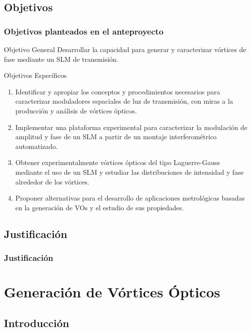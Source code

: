 \documentclass[xcolor=table,serif]{beamer}
\begin{document}
\subsection{Objetivos}
\begin{frame}
  \frametitle{Objetivos planteados en el anteproyecto}
  \begin{block}{Objetivo General}
    Desarrollar la capacidad para generar y caracterizar vórtices de fase
    mediante un SLM de transmisión. 
  \end{block}
  \begin{block}{Objetivos Espec\'ificos}
    \small
    \begin{enumerate}
	\item Identificar y apropiar los conceptos y
                  procedimientos necesarios para caracterizar
                  moduladores espaciales de luz de transmisión, con
                  miras a la producción y análisis de vórtices
                  ópticos. 
        \item Implementar una plataforma experimental para
                  caracterizar la modulación de amplitud y fase de un
                  SLM a partir de un montaje interferométrico
                  automatizado. 
         \item Obtener experimentalmente vórtices ópticos del
                  tipo Laguerre-Gauss mediante el uso de un SLM y
                  estudiar las distribuciones de intensidad y fase
                  alrededor de los vórtices. 
         \item Proponer alternativas para el desarrollo de
                  aplicaciones metrológicas basadas en la generación
                  de VOs y el estudio de sus propiedades.
       \end{enumerate}
     \end{block}
   \end{frame}
 \subsection{Justificación}
 \begin{frame}
   \frametitle{Justificación}
  \end{frame}

\section{Generación de Vórtices Ópticos}
\subsection{Introducción}
\end{document}
